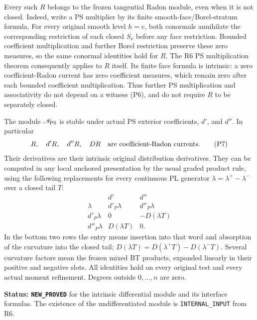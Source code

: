 Every such $R$ belongs to the frozen tangential Radon module,
even when it is not closed.  Indeed, write a PS multiplier by
its finite smooth-face/Borel-stratum formula.  For every original
smooth level $h=c$, both conormals annihilate the corresponding
restriction of each closed $S_\nu$ before any face restriction.
Bounded coefficient multiplication and further Borel restriction
preserve these zero measures, so the same conormal identities
hold for $R$.  The R6 PS multiplication theorem consequently
applies to $R$ itself.  Its finite face formula is intrinsic:
a zero coefficient-Radon current has zero coefficient measures,
which remain zero after each bounded coefficient multiplication.
Thus further PS multiplication and associativity do not depend
on a witness (P6), and do not require $R$ to be separately closed.

\begin{theorem}
\label{thm:r10-pws-derivative-radon-closure}
The module $\mathscr N_{\rm PS}$ is stable under actual PS
exterior coefficients, $d'$, and $d''$.  In particular
\[
                        R,\quad d'R,\quad d''R,\quad DR
                   \quad\hbox{are coefficient-Radon currents}.
 \tag{P7}
\]
Their derivatives are their intrinsic original distribution
derivatives.  They can be computed in any local anchored
presentation by the usual graded product rule, using the
following replacements for every continuous PL generator
$\lambda=\lambda^+-\lambda^-$ over a closed tail $T$:
\[
 \begin{array}{c|cc}
 &d'&d''\\ \hline
 \lambda&d'_P\lambda&d''_P\lambda\\
 d'_P\lambda&0&-D(\lambda T)\\
 d''_P\lambda&D(\lambda T)&0 .
 \end{array}
 \tag{P8}
\]
In the bottom two rows the entry means insertion into that
word and absorption of the curvature into the closed tail;
$D(\lambda T)=D(\lambda^+T)-D(\lambda^-T)$.
Several curvature factors mean the frozen mixed BT products,
expanded linearly in their positive and negative slots.
All identities hold on every original test and every actual
moment refinement.  Degrees outside $0,\ldots,n$ are zero.
\end{theorem}

\noindent\textbf{Status: \texttt{NEW\_PROVED}} for the
intrinsic differential module and its interface formulas.
The existence of the undifferentiated module is
\texttt{INTERNAL\_INPUT} from R6.

